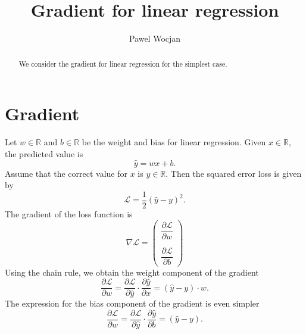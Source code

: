 \documentclass[12pt]{article}
\title{Gradient for linear regression}
\author{Pawel Wocjan}
\newcommand{\R}{\mathbb{R}}
\begin{document}
\maketitle


\begin{abstract}
We consider the gradient for linear regression for the simplest case.
\end{abstract}

\section{Gradient}

Let $w\in\R$ and $b\in\R$ be the weight and bias for linear regression.  Given $x\in\R$, the predicted value is
\begin{equation}
\hat{y} = w x + b.
\end{equation}
Assume that the correct value for $x$ is $y\in \R$.  Then the squared error loss is given by
\begin{equation}
\mathcal{L} = \frac{1}{2}(\hat{y}-y)^2.
\end{equation}
The gradient of the loss function is 
\begin{equation}
\nabla\mathcal{L} = \left(
\begin{array}{c}
\dfrac{\partial \mathcal{L}}{\partial w}  \\
\\
\dfrac{\partial \mathcal{L}}{\partial b} 
\end{array}
\right)
\end{equation}
Using the chain rule, we obtain the weight component of the gradient
\begin{equation}
\dfrac{\partial \mathcal{L}}{\partial w} =
\dfrac{\partial \mathcal{L}}{\partial\hat{y}} \cdot \dfrac{\partial \hat{y}}{\partial x} =
(\hat{y} - y) \cdot w.
\end{equation}
The expression for the bias component of the gradient is even simpler
\begin{equation}
\dfrac{\partial \mathcal{L}}{\partial w} =
\dfrac{\partial \mathcal{L}}{\partial\hat{y}} \cdot \dfrac{\partial \hat{y}}{\partial b} =
(\hat{y} - y).
\end{equation}
\end{document}
